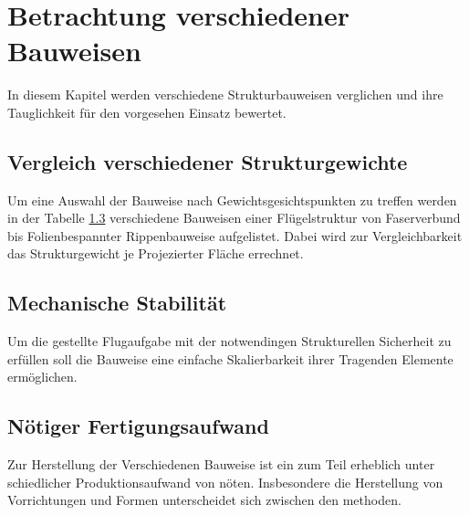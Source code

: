 \chapter{Betrachtung verschiedener Bauweisen}\label{cha:Statistische Betrachtung bisheriger Bauformen}

In diesem Kapitel werden verschiedene Strukturbauweisen verglichen und ihre Tauglichkeit für den vorgesehen Einsatz bewertet.

\section{Vergleich verschiedener Strukturgewichte}

Um eine Auswahl der Bauweise nach Gewichtsgesichtspunkten zu treffen werden in der Tabelle \ref{} verschiedene Bauweisen einer Flügelstruktur von Faserverbund bis Folienbespannter Rippenbauweise aufgelistet. Dabei wird zur Vergleichbarkeit das Strukturgewicht je Projezierter Fläche errechnet.

\section{Mechanische Stabilität}

Um die gestellte Flugaufgabe mit der notwendingen Strukturellen Sicherheit zu erfüllen soll die Bauweise eine einfache Skalierbarkeit ihrer Tragenden Elemente ermöglichen.


\section{Nötiger Fertigungsaufwand}

Zur Herstellung der Verschiedenen Bauweise ist ein zum Teil erheblich unter schiedlicher Produktionsaufwand von nöten. Insbesondere die Herstellung von Vorrichtungen und Formen unterscheidet sich zwischen den methoden. 